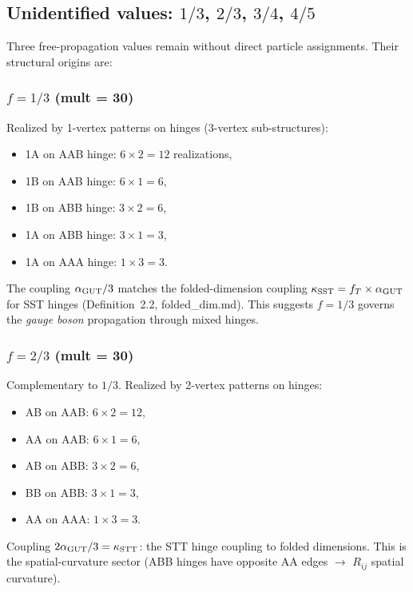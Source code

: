 \subsection{Unidentified values: $1/3$, $2/3$, $3/4$, $4/5$}
\label{sec:unidentified}

Three free-propagation values remain without direct particle assignments.  Their structural origins are:

\subsubsection{$f = 1/3$ (mult = 30)}

Realized by 1-vertex patterns on hinges (3-vertex sub-structures):
\begin{itemize}
\item 1A on AAB hinge: $6 \times 2 = 12$ realizations,
\item 1B on AAB hinge: $6 \times 1 = 6$,
\item 1B on ABB hinge: $3 \times 2 = 6$,
\item 1A on ABB hinge: $3 \times 1 = 3$,
\item 1A on AAA hinge: $1 \times 3 = 3$.
\end{itemize}
The coupling $\alpha_{\mathrm{GUT}}/3$ matches the folded-dimension coupling $\kappa_\mathrm{SST} = f_T \times \alpha_{\mathrm{GUT}}$ for SST hinges (Definition~2.2, folded\_dim.md).  This suggests $f = 1/3$ governs the \emph{gauge boson} propagation through mixed hinges.

\subsubsection{$f = 2/3$ (mult = 30)}

Complementary to $1/3$.  Realized by 2-vertex patterns on hinges:
\begin{itemize}
\item AB on AAB: $6 \times 2 = 12$,
\item AA on AAB: $6 \times 1 = 6$,
\item AB on ABB: $3 \times 2 = 6$,
\item BB on ABB: $3 \times 1 = 3$,
\item AA on AAA: $1 \times 3 = 3$.
\end{itemize}
Coupling $2\alpha_{\mathrm{GUT}}/3 = \kappa_\mathrm{STT}$: the STT hinge coupling to folded dimensions.  This is the spatial-curvature sector (ABB hinges have opposite AA edges $\to$ $R_{ij}$ spatial curvature).

